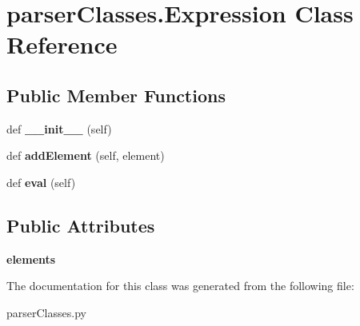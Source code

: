 \hypertarget{classparser_classes_1_1_expression}{}\section{parser\+Classes.\+Expression Class Reference}
\label{classparser_classes_1_1_expression}
\subsection*{Public Member Functions}
\begin{DoxyCompactItemize}
\item 
def {\bfseries \+\_\+\+\_\+init\+\_\+\+\_\+} (self)\hypertarget{classparser_classes_1_1_expression_ae01f3aaff0913d71e84dd96fb520541c}{}\label{classparser_classes_1_1_expression_ae01f3aaff0913d71e84dd96fb520541c}

\item 
def {\bfseries add\+Element} (self, element)\hypertarget{classparser_classes_1_1_expression_a0065ec38485063fce29c52fcd4fa0156}{}\label{classparser_classes_1_1_expression_a0065ec38485063fce29c52fcd4fa0156}

\item 
def {\bfseries eval} (self)\hypertarget{classparser_classes_1_1_expression_a9eb95e98f5d2ac1c133830abf80dae82}{}\label{classparser_classes_1_1_expression_a9eb95e98f5d2ac1c133830abf80dae82}

\end{DoxyCompactItemize}
\subsection*{Public Attributes}
\begin{DoxyCompactItemize}
\item 
{\bfseries elements}\hypertarget{classparser_classes_1_1_expression_a68033b9f9c015d5507c42206c801e324}{}\label{classparser_classes_1_1_expression_a68033b9f9c015d5507c42206c801e324}

\end{DoxyCompactItemize}


The documentation for this class was generated from the following file\+:\begin{DoxyCompactItemize}
\item 
parser\+Classes.\+py\end{DoxyCompactItemize}
